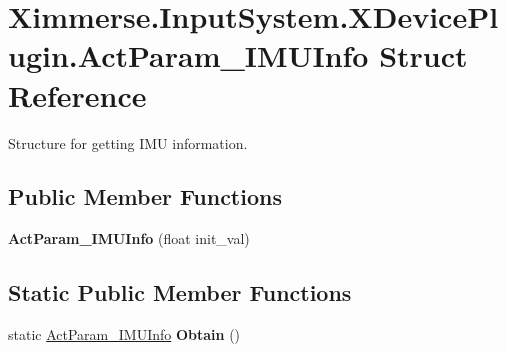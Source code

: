 \hypertarget{struct_ximmerse_1_1_input_system_1_1_x_device_plugin_1_1_act_param___i_m_u_info}{}\section{Ximmerse.\+Input\+System.\+X\+Device\+Plugin.\+Act\+Param\+\_\+\+I\+M\+U\+Info Struct Reference}
\label{struct_ximmerse_1_1_input_system_1_1_x_device_plugin_1_1_act_param___i_m_u_info}


Structure for getting I\+MU information. ~\newline
  


\subsection*{Public Member Functions}
\begin{DoxyCompactItemize}
\item 
\mbox{\label{struct_ximmerse_1_1_input_system_1_1_x_device_plugin_1_1_act_param___i_m_u_info_a3a56437effe2ba0259193c7269306671}} 
{\bfseries Act\+Param\+\_\+\+I\+M\+U\+Info} (float init\+\_\+val)
\end{DoxyCompactItemize}
\subsection*{Static Public Member Functions}
\begin{DoxyCompactItemize}
\item 
\mbox{\label{struct_ximmerse_1_1_input_system_1_1_x_device_plugin_1_1_act_param___i_m_u_info_ad357a5734a79b29e0fd494ba4a0bd23a}} 
static \mbox{\hyperlink{struct_ximmerse_1_1_input_system_1_1_x_device_plugin_1_1_act_param___i_m_u_info}{Act\+Param\+\_\+\+I\+M\+U\+Info}} {\bfseries Obtain} ()
\end{DoxyCompactItemize}
